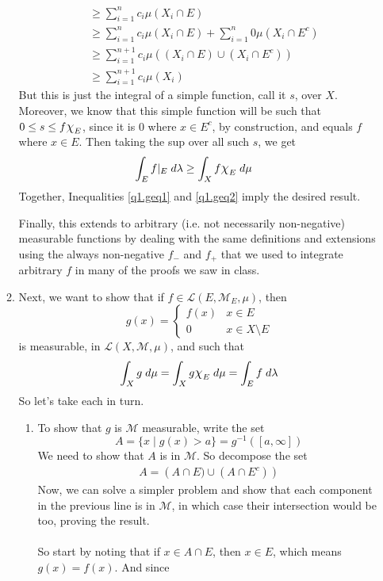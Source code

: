 \documentclass[12pt]{article}
\theoremstyle{plain}
\theoremstyle{definition}
\theoremstyle{remark}
\newcommand*{\Chi}{\mbox{\large$\chi$}} %
\begin{document}
\begin{enumerate}
\begin{enumerate}
\begin{align*}
        &\geq \sum^n_{i=1} c_i \mu(X_i \cap E)  \\
        &\geq \sum^n_{i=1} c_i \mu(X_i \cap E)  + 
            \sum^n_{i=1} 0 \mu(X_i \cap E^c)  \\
        &\geq \sum^{n+1}_{i=1} c_i \mu((X_i \cap E) \cup (X_i\cap E^c))  \\
        &\geq \sum^{n+1}_{i=1} c_i \mu(X_i)
\end{align*}
But this is just the integral of a simple function, call it $s$, over $X$. Moreover, we know that this simple function will be such that $0\leq s \leq f\Chi_E$, since it is 0 where $x\in E^c$, by construction, and equals $f$ where $x\in E$. Then taking the sup over all such $s$, we get
\begin{align}
    \label{q1.geq2}
    \int_E f|_E \; d\lambda
        &\geq \int_X f \Chi_E \; d\mu
\end{align}
Together, Inequalities \ref{q1.geq1} and \ref{q1.geq2} imply the desired result.

Finally, this extends to arbitrary (i.e. not necessarily non-negative) measurable functions by dealing with the same definitions and extensions using the always non-negative $f_-$ and $f_+$ that we used to integrate arbitrary $f$ in many of the proofs we saw in class. 

\item Next, we want to show that if $f\in\mathscr{L}(E,\mathscr{M}_E,\mu)$, then
\begin{equation}
    g(x) = \begin{cases} f(x) & x \in E \\ 0 & x\in X\setminus E \end{cases}
\end{equation}
is measurable, in $\mathscr{L}(X,\mathscr{M},\mu)$, and such that 
\begin{equation}
    \label{q1b}
    \int_X g \; d\mu = \int_X g \Chi_E \; d\mu = \int_E f \; d\lambda
\end{equation}
So let's take each in turn.
\begin{enumerate}
    \item  To show that $g$ is $\mathscr{M}$ measurable, write the set 
\[
    A = \{x \; | \; g(x) > a\} = g^{-1}([a,\infty])
\]
We need to show that $A$ is in $\mathscr{M}$. So decompose the set
\begin{align*}
    A = \left(A \cap E) \cup (A\cap E^c)\right)
\end{align*}
Now, we can solve a simpler problem and show that each component in the previous line is in $\mathscr{M}$, in which case their intersection would be too, proving the result.
\\
\\
So start by noting that if $x\in A\cap E$, then $x\in E$, which means $g(x)=f(x)$. And since 


\end{enumerate}
\end{enumerate}
\end{enumerate}
\end{document}

